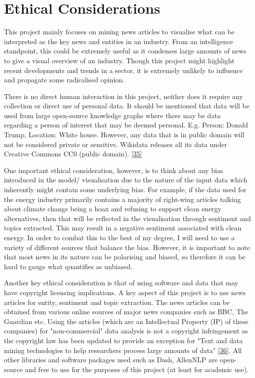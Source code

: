 
\chapter{Ethical Considerations}
\vspace{-2ex}
This project mainly focuses on mining news articles to visualise what can be interpreted as the key news and entities in an industry. From an intelligence standpoint, this could be extremely useful as it condenses large amounts of news to give a visual overview of an industry. Though this project might highlight recent developments and trends in a sector, it is extremely unlikely to influence and propagate some radicalised opinion. 

There is no direct human interaction in this project, neither does it require any collection or direct use of personal data. It should be mentioned that data will be used from large open-source knowledge graphs where there may be data regarding a person of interest that may be deemed personal. E.g. Person: Donald Trump, Location: White house. However, any data that is in public domain will not be considered private or sensitive. Wikidata releases all its data under Creative Commons CC0 (public domain). \hyperlink{35}{[35]} 

One important ethical consideration, however, is to think about any bias introduced in the model/ visualisation due to the nature of the input data which inherently might contain some underlying bias. For example, if the data used for the energy industry primarily contains a majority of right-wing articles talking about climate change being a hoax and refusing to support clean energy alternatives, then that will be reflected in the visualisation through sentiment and topics extracted. This may result in a negative sentiment associated with clean energy. In order to combat this to the best of my degree, I will need to use a variety of different sources that balance the bias. However, it is important to note that most news in its nature can be polarising and biased, so therefore it can be hard to gauge what quantifies as unbiased.

Another key ethical consideration is that of using software and data that may have copyright licensing implications. A key aspect of this project is to use news articles for entity, sentiment and topic extraction. The news articles can be obtained from various online sources of major news companies such as BBC, The Guardian etc. Using the articles (which are an Intellectual Property (IP) of these companies) for "non-commercial" data analysis is not a copyright infringement as the copyright law has been updated to provide an exception for "Text and data mining technologies to help researchers process large amounts of data" \hyperlink{36}{[36]}. All other libraries and software packages used such as Dash, AllenNLP are open-source and free to use for the purposes of this project (at least for academic use).